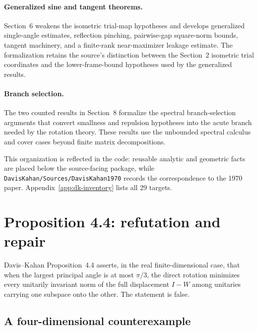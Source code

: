 \documentclass[11pt]{article}
\newcommand{\DKResultCount}{29}
\begin{document}
\paragraph{Generalized sine and tangent theorems.}
Section~6 weakens the isometric trial-map hypotheses and develops generalized
single-angle estimates, reflection pinching, pairwise-gap square-norm bounds,
tangent machinery, and a finite-rank near-maximizer leakage estimate.  The
formalization retains the source's distinction between the Section~2 isometric
trial coordinates and the lower-frame-bound hypotheses used by the generalized
results.

\paragraph{Branch selection.}
The two counted results in Section~8 formalize the spectral branch-selection
arguments that convert smallness and repulsion hypotheses into the acute branch
needed by the rotation theory.  These results use the unbounded spectral
calculus and cover cases beyond finite matrix decompositions.

This organization is reflected in the code: reusable analytic and geometric
facts are placed below the source-facing package, while
\texttt{DavisKahan/Sources/DavisKahan1970} records the correspondence to the
1970 paper.  Appendix~\ref{app:dk-inventory} lists all \DKResultCount{} targets.

\section{Proposition 4.4: refutation and repair}
\label{sec:prop44}

Davis--Kahan Proposition~4.4 asserts, in the real finite-dimensional case, that
when the largest principal angle is at most $\pi/3$, the direct rotation
minimizes every unitarily invariant norm of the full displacement $I-W$ among
unitaries carrying one subspace onto the other.  The statement is false.

\subsection{A four-dimensional counterexample}
\end{document}
